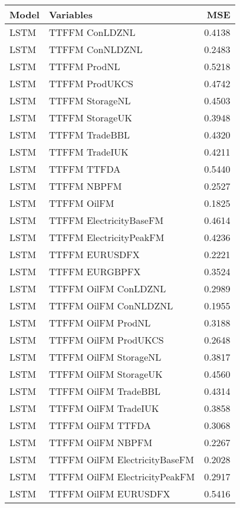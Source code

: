 \begin{table}[h!]
\centering
 \begin{adjustbox}{max width=\textwidth}
\begin{tabular}{llr}
  \hline
Model & Variables & MSE \\ 
  \hline
LSTM & TTFFM ConLDZNL & 0.4138 \\ 
  LSTM & TTFFM ConNLDZNL & 0.2483 \\ 
  LSTM & TTFFM ProdNL & 0.5218 \\ 
  LSTM & TTFFM ProdUKCS & 0.4742 \\ 
  LSTM & TTFFM StorageNL & 0.4503 \\ 
  LSTM & TTFFM StorageUK & 0.3948 \\ 
  LSTM & TTFFM TradeBBL & 0.4320 \\ 
  LSTM & TTFFM TradeIUK & 0.4211 \\ 
  LSTM & TTFFM TTFDA & 0.5440 \\ 
  LSTM & TTFFM NBPFM & 0.2527 \\ 
  LSTM & TTFFM OilFM & 0.1825 \\ 
  LSTM & TTFFM ElectricityBaseFM & 0.4614 \\ 
  LSTM & TTFFM ElectricityPeakFM & 0.4236 \\ 
  LSTM & TTFFM EURUSDFX & 0.2221 \\ 
  LSTM & TTFFM EURGBPFX & 0.3524 \\ 
  LSTM & TTFFM OilFM ConLDZNL & 0.2989 \\ 
  LSTM & TTFFM OilFM ConNLDZNL & 0.1955 \\ 
  LSTM & TTFFM OilFM ProdNL & 0.3188 \\ 
  LSTM & TTFFM OilFM ProdUKCS & 0.2648 \\ 
  LSTM & TTFFM OilFM StorageNL & 0.3817 \\ 
  LSTM & TTFFM OilFM StorageUK & 0.4560 \\ 
  LSTM & TTFFM OilFM TradeBBL & 0.4314 \\ 
  LSTM & TTFFM OilFM TradeIUK & 0.3858 \\ 
  LSTM & TTFFM OilFM TTFDA & 0.3068 \\ 
  LSTM & TTFFM OilFM NBPFM & 0.2267 \\ 
  LSTM & TTFFM OilFM ElectricityBaseFM & 0.2028 \\ 
  LSTM & TTFFM OilFM ElectricityPeakFM & 0.2917 \\ 
  LSTM & TTFFM OilFM EURUSDFX & 0.5416 \\ 

\end{tabular}
\end{adjustbox}
\end{table}
